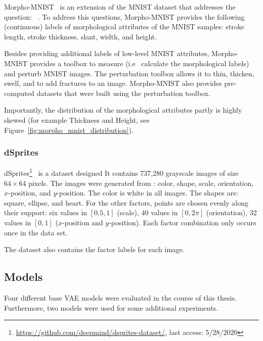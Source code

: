 Morpho-MNIST~\citep{castro2019morpho} is an extension of the MNIST dataset that addresses the question:  ~\citep{castro2019morpho}.
To address this questions, Morpho-MNIST provides the following (continuous) labels of morphological attributes of the MNIST samples: stroke length, stroke thickness, slant, width, and height.

Besides providing additional labels of low-level MNIST attributes, Morpho-MNIST provides a toolbox to measure (i.e~ calculate the morphological labels) and perturb MNIST images.
The perturbation toolbox allows it to thin, thicken, swell, and to add fractures to an image.
Morpho-MNIST also provides pre-computed datasets that were built using the perturbation toolbox.

Importantly, the distribution of the morphological attributes partly is highly skewed (for example Thickness and Height, see Figure~\ref{fig:morpho_mnist_distribution}).

\subsubsection{dSprites}
dSprites\footnote{\href{https://github.com/deepmind/dsprites-dataset/}{https://github.com/deepmind/dsprites-dataset/}, last access: 5/28/2020}~\citep{dsprites17} is a dataset designed 
It contains 737,280 grayscale images of size $64\times 64$ pixels.
The images were generated from : color, shape, scale, orientation, $x$-position, and $y$-position.
The color is white in all images.
The shapes are: square, ellipse, and heart.
For the other factors, points are chosen evenly along their support: six values in $[0.5, 1]$ (scale), 40 values in $[0, 2\pi]$ (orientation), 32 values in $[0, 1]$ ($x$-position and $y$-position).
Each factor combination only occurs once in the data set.

The dataset also contains the factor labels for each image.

\subsection{Models}\label{subsec:models}

Four different base \ac{VAE} models were evaluated in the course of this thesis.
Furthermore, two  models were used for some additional experiments.

